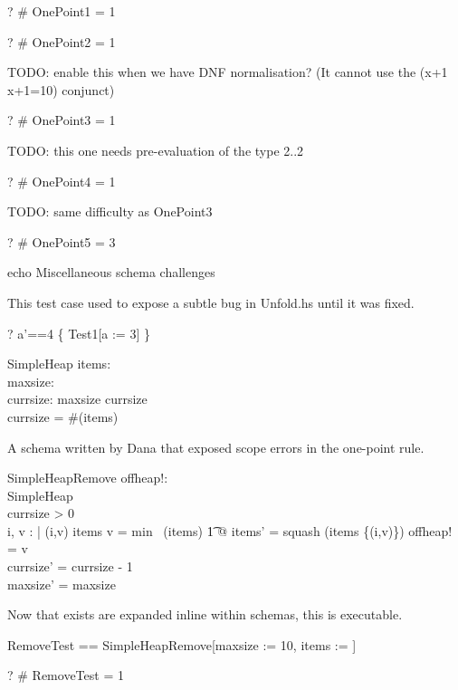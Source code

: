 \documentclass{article}
\begin{document}
\begin{zed} \vdash? \# OnePoint1 = 1 \end{zed}
\begin{zed} \vdash? \# OnePoint2 = 1 \end{zed}
TODO: enable this when we have DNF normalisation?
(It cannot use the (x+1 \in \nat \implies x+1=10) conjunct)
\begin{zed} \vdash? \# OnePoint3 = 1 \end{zed}
TODO: this one needs pre-evaluation of the type 2..2
\begin{zed} \vdash? \# OnePoint4 = 1 \end{zed}
TODO: same difficulty as OnePoint3
\begin{zed} \vdash? \# OnePoint5 = 3 \end{zed}


echo Miscellaneous schema challenges


This test case used to expose a subtle bug in Unfold.hs
until it was fixed.
\begin{zed} \vdash? \lblot a'==4 \rblot \in \{ Test1[a := 3] \} \end{zed}

\begin{schema}{SimpleHeap}
    items: \seq \nat \\
    maxsize: \nat \\
    currsize: \nat
\where
    maxsize \geq currsize \\
    currsize = \#(\ran items)
\end{schema}

A schema written by Dana that exposed scope errors in the one-point rule.
\begin{schema}{SimpleHeapRemove}
    offheap!: \nat \\
    \Delta SimpleHeap \\
\where
    currsize > 0 \\
    \exists i, v : \nat | (i,v) \in items \land v = min~ (\ran items)
    \t1 @ items' = squash (items \setminus \{(i,v)\}) \land offheap! = v\\ 
    currsize' = currsize - 1 \\
    maxsize' = maxsize 
\end{schema}

Now that exists are expanded inline within schemas, this is executable.
\begin{zed}
  RemoveTest == SimpleHeapRemove[maxsize := 10, 
                                    items :=  \rangle]
\end{zed}
\begin{zed} \vdash? \# RemoveTest = 1 \end{zed}
\end{document}
